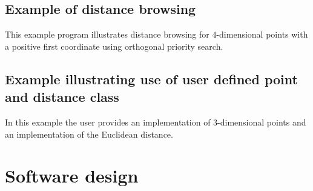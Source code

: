 

\subsection{Example of distance browsing}

This example program illustrates distance browsing for $4$-dimensional points with
a positive first coordinate using orthogonal priority search.

 


\subsection{Example illustrating use of user defined point and distance class}

In this example the user provides an implementation of 3-dimensional points and an
implementation of the Euclidean distance.


\section{Software design}

